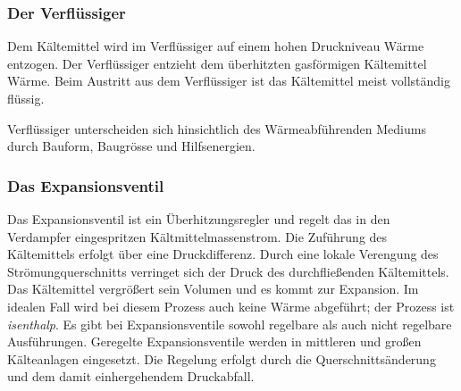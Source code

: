 \subsubsection*{Der Verflüssiger}

Dem Kältemittel wird im Verflüssiger auf einem hohen Druckniveau Wärme entzogen. Der Verflüssiger entzieht dem überhitzten gasförmigen Kältemittel Wärme. Beim Austritt aus dem Verflüssiger ist das Kältemittel meist vollständig flüssig. 


Verflüssiger unterscheiden sich hinsichtlich des Wärmeabführenden Mediums durch Bauform, Baugrösse und Hilfsenergien.



\subsubsection*{Das Expansionsventil}

Das Expansionsventil ist ein Überhitzungsregler und regelt das in den Verdampfer eingespritzen Kältmittelmassenstrom. Die Zuführung des Kältemittels erfolgt über eine Druckdifferenz. Durch eine lokale Verengung des Strömungquerschnitts verringet sich der Druck des durchfließenden Kältemittels. Das Kältemittel vergrößert sein Volumen und es kommt zur Expansion. Im idealen Fall wird bei diesem Prozess auch keine Wärme abgeführt; der Prozess ist \textit{isenthalp}. 
 Es gibt bei Expansionsventile sowohl  regelbare als auch nicht regelbare Ausführungen.  Geregelte Expansionsventile werden in mittleren und großen Kälteanlagen eingesetzt. Die Regelung erfolgt durch die Querschnittsänderung und dem damit einhergehendem Druckabfall.  

